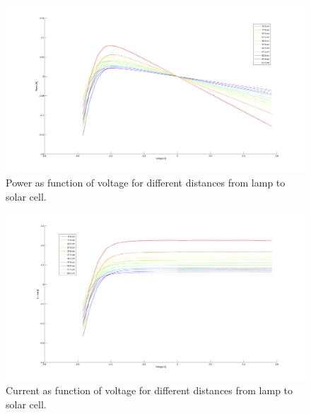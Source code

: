 \documentclass[12pt,a4paper]{article}
\begin{document}
\begin{figure}[h!]
  \begin{center}
    \includegraphics[scale=0.07]{PvsV.png}
  \end{center}
  \caption{Power as function of voltage for different distances from lamp to solar cell.}
  \label{pvsv}
\end{figure}

\begin{figure}[h!]
  \begin{center}
    \includegraphics[scale=0.07]{IvsU.png}
  \end{center}
  \caption{Current as function of voltage for different distances from lamp to solar cell.}
  \label{ivsu}
\end{figure}
\end{document}
